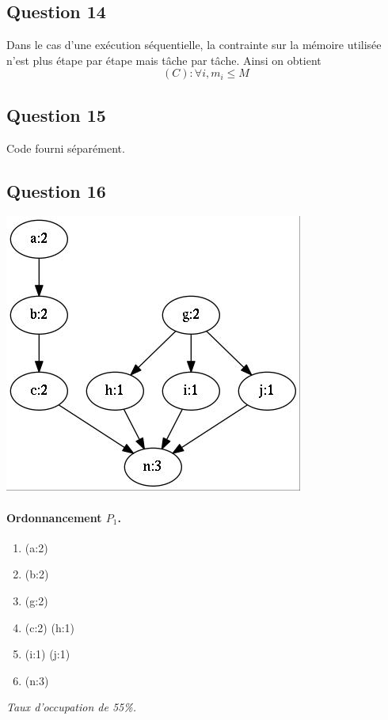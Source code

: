 \documentclass[11pt]{article}
\newenvironment{titledenumerate}[1]
  {\paragraph{#1} \begin{enumerate}}
  {\end{enumerate}}
\begin{document}
  \subsection{Question 14}
    Dans le cas d'une exécution séquentielle, la contrainte sur la mémoire
    utilisée n'est plus étape par étape mais tâche par tâche. Ainsi on obtient
    \[ (C): \forall i, m_i \leq M \]

  \subsection{Question 15}
    Code fourni séparément.

  \subsection{Question 16}
    \begin{multicols}{3}
      \begin{center}
        \includegraphics[width=0.9\linewidth]{fig/graph16a.jpg}
      \end{center}

      \begin{titledenumerate}{Ordonnancement $P_1$.}
        \item (a:2)
        \item (b:2)
        \item (g:2)
        \item (c:2) (h:1)
        \item (i:1) (j:1)
        \item (n:3)
      \end{titledenumerate}
      \emph{Taux d'occupation de 55\%.}


\end{multicols}
\end{document}
